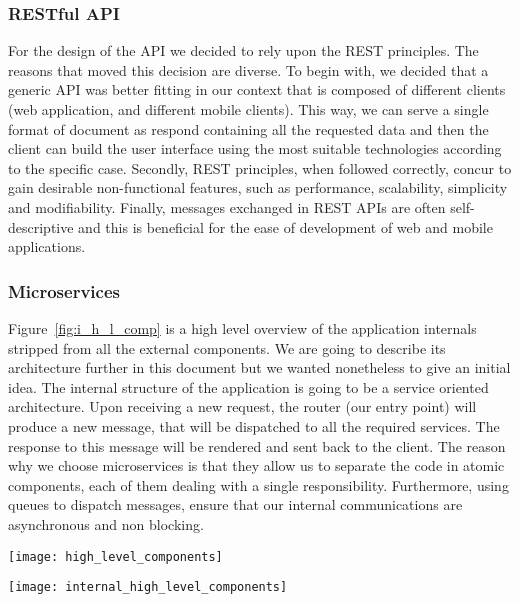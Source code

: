 \subsubsection{RESTful API}
For the design of the API we decided to rely upon the REST principles. The reasons that moved
this decision are diverse. To begin with, we decided that a generic API was better fitting
in our context that is composed of different clients (web application, and different mobile
clients). This way, we can serve a single format of document as respond containing all the 
requested data and then the client can build the user interface using the most suitable
technologies according to the specific case.
Secondly, REST principles, when followed correctly, concur to gain desirable non-functional
features, such as performance, scalability, simplicity and modifiability.
Finally, messages exchanged in REST APIs are often self-descriptive and this is beneficial
for the ease of development of web and mobile applications.

\subsubsection{Microservices}
Figure~\ref{fig:i_h_l_comp} is a high level overview of the application internals stripped from all
the external components. We are going to describe its architecture further in this document
but we wanted nonetheless to give an initial idea.
The internal structure of the application is going to be a service oriented architecture.
Upon receiving a new request, the router (our entry point) will produce a new message,
that will be dispatched to all the required services. The response to this message will
be rendered and sent back to the client.
The reason why we choose microservices is that they allow us to separate the code in
atomic components, each of them dealing with a single responsibility.
Furthermore, using queues to dispatch messages, ensure that our internal communications
are asynchronous and non blocking.

\begin{sidewaysfigure}
\centering
\texttt{[image: high\_level\_components]}
\caption{Component view: High Level Architecture}
\label{fig:h_l_comp}
\end{sidewaysfigure}

\begin{sidewaysfigure}
\centering
\texttt{[image: internal\_high\_level\_components]}
\caption{Component view: Internal High Level Architecture}
\label{fig:i_h_l_comp}
\end{sidewaysfigure}

